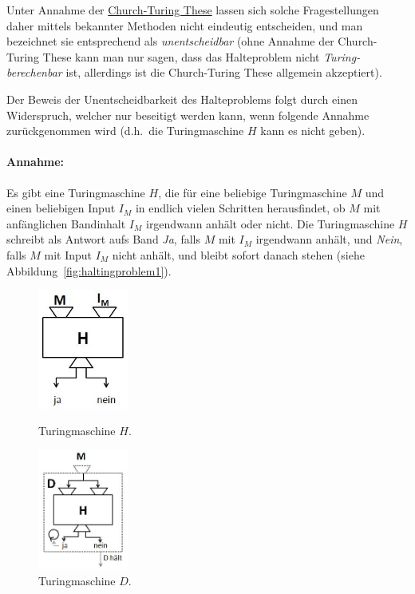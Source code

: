 Unter Annahme der \href{http://de.wikipedia.org/wiki/Church-Turing-These}{Church-Turing These} lassen sich solche Fragestellungen daher mittels bekannter Methoden nicht eindeutig entscheiden, und man bezeichnet sie entsprechend als \emph{unentscheidbar} (ohne Annahme der Church-Turing These kann man nur sagen, dass das Halteproblem nicht \emph{Turing-berechenbar} ist, allerdings ist die Church-Turing These allgemein akzeptiert).

Der Beweis der Unentscheidbarkeit des Halteproblems folgt durch einen Widerspruch, welcher nur beseitigt werden kann, wenn folgende Annahme zurückgenommen wird (d.h.\ die Turingmaschine $H$ kann es nicht geben).

\paragraph{Annahme:} Es gibt eine Turingmaschine $H$, die für eine beliebige Turingmaschine $M$ und einen beliebigen Input $I_M$ in endlich vielen Schritten herausfindet, ob $M$ mit anfänglichen Bandinhalt $I_M$ irgendwann anhält oder nicht. Die Turingmaschine $H$ schreibt als Antwort aufs Band \emph{Ja}, falls $M$ mit $I_M$ irgendwann anhält, und \emph{Nein}, falls $M$ mit Input $I_M$ nicht anhält, und bleibt sofort danach stehen (siehe Abbildung~\ref{fig:haltingproblem1}).

\begin{figure}[h]
\begin{minipage}[h]{0.475\textwidth}
\centering
\includegraphics[width=3cm]{img/haltingproblem1.jpg}
    \caption{Turingmaschine $H$.}
    \label{fig:haltingproblem1}
\end{minipage}
%
\begin{minipage}[h]{0.475\textwidth}
\centering
\includegraphics[width=3cm]{img/haltingproblem2.jpg}
    \caption{Turingmaschine $D$.}
    \label{fig:haltingproblem2}
\end{minipage}
\end{figure}

